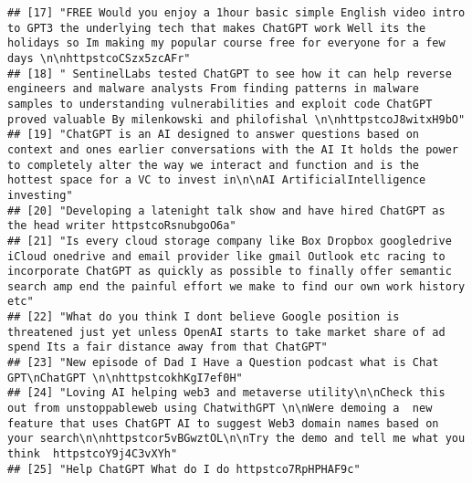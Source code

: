 \documentclass[
]{article}
\begin{document}
\begin{verbatim}
## [17] "FREE Would you enjoy a 1hour basic simple English video intro to GPT3 the underlying tech that makes ChatGPT work Well its the holidays so Im making my popular course free for everyone for a few days \n\nhttpstcoCSzx5zcAFr"                                                                                    
## [18] " SentinelLabs tested ChatGPT to see how it can help reverse engineers and malware analysts From finding patterns in malware samples to understanding vulnerabilities and exploit code ChatGPT proved valuable By milenkowski and philofishal \n\nhttpstcoJ8witxH9bO"                                               
## [19] "ChatGPT is an AI designed to answer questions based on context and ones earlier conversations with the AI It holds the power to completely alter the way we interact and function and is the hottest space for a VC to invest in\n\nAI ArtificialIntelligence investing"                                           
## [20] "Developing a latenight talk show and have hired ChatGPT as the head writer httpstcoRsnubgoO6a"                                                                                                                                                                                                                     
## [21] "Is every cloud storage company like Box Dropbox googledrive iCloud onedrive and email provider like gmail Outlook etc racing to incorporate ChatGPT as quickly as possible to finally offer semantic search amp end the painful effort we make to find our own work history etc"                                   
## [22] "What do you think I dont believe Google position is threatened just yet unless OpenAI starts to take market share of ad spend Its a fair distance away from that ChatGPT"                                                                                                                                          
## [23] "New episode of Dad I Have a Question podcast what is Chat GPT\nChatGPT \n\nhttpstcokhKgI7ef0H"                                                                                                                                                                                                                     
## [24] "Loving AI helping web3 and metaverse utility\n\nCheck this out from unstoppableweb using ChatwithGPT \n\nWere demoing a  new feature that uses ChatGPT AI to suggest Web3 domain names based on your search\n\nhttpstcor5vBGwztOL\n\nTry the demo and tell me what you think  httpstcoY9j4C3vXYh"                  
## [25] "Help ChatGPT What do I do httpstco7RpHPHAF9c"                                                                                                                                                                                                                                                                      

\end{verbatim}
\end{document}
